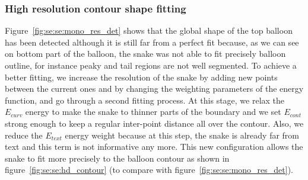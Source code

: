 

\subsubsection{High resolution contour shape fitting}
Figure~\ref{fig:se:se:mono_res_det} shows that the global shape of the top balloon has been detected although it is still far from a perfect fit because, as we can see on bottom part of the balloon, the snake was not able to fit precisely balloon outline, for instance peaky and tail regions are not well segmented.
To achieve a better fitting, we increase the resolution of the snake by adding new points between the current ones and by changing the weighting parameters of the energy function, and go through a second fitting process.
At this stage, we relax the $E_{curv}$ energy to make the snake to thinner parts of the boundary and we set $E_{cont}$ strong enough to keep a regular inter-point distance all over the contour.
Also, we reduce the $E_{text}$ energy weight because at this step, the snake is already far from text and this term is not informative any more.
This new configuration allows the snake to fit more precisely to the balloon contour as shown in figure~\ref{fig:se:se:hd_contour} (to compare with figure~\ref{fig:se:se:mono_res_det}).

